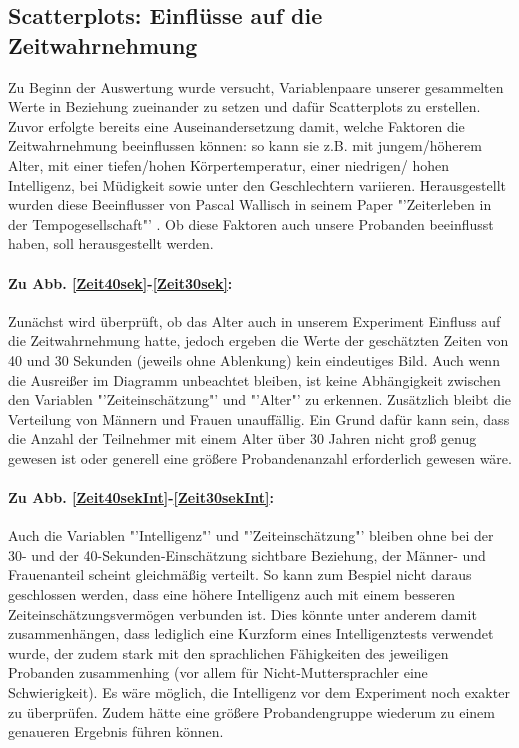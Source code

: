 \documentclass{Paper}
\begin{document}
\subsection{Scatterplots: Einflüsse auf die Zeitwahrnehmung}
Zu Beginn der Auswertung wurde versucht, Variablenpaare unserer gesammelten Werte in Beziehung zueinander zu setzen und dafür Scatterplots zu erstellen. Zuvor erfolgte bereits eine Auseinandersetzung damit, welche Faktoren die Zeitwahrnehmung beeinflussen können: so kann sie z.B. mit jungem/höherem Alter, mit einer tiefen/hohen Körpertemperatur, einer niedrigen/ hohen Intelligenz, bei Müdigkeit sowie unter den Geschlechtern variieren. Herausgestellt wurden diese Beeinflusser von Pascal Wallisch in seinem Paper "'Zeiterleben in der Tempogesellschaft"' \cite{Wallisch2003}. Ob diese Faktoren auch unsere Probanden beeinflusst haben, soll herausgestellt werden.

\paragraph{Zu Abb. \ref{Zeit40sek}-\ref{Zeit30sek}:}
Zunächst wird überprüft, ob das Alter auch in unserem Experiment Einfluss auf die Zeitwahrnehmung hatte, jedoch ergeben die Werte der geschätzten Zeiten von 40 und 30 Sekunden (jeweils ohne Ablenkung) kein eindeutiges Bild. Auch wenn die Ausreißer im Diagramm unbeachtet bleiben, ist keine Abhängigkeit zwischen den Variablen "'Zeiteinschätzung"' und "'Alter"' zu erkennen. Zusätzlich bleibt die Verteilung von Männern und Frauen unauffällig. Ein Grund dafür kann sein, dass die Anzahl der Teilnehmer mit einem Alter über 30 Jahren nicht groß genug gewesen ist oder generell eine größere Probandenanzahl erforderlich gewesen wäre.

\paragraph{Zu Abb. \ref{Zeit40sekInt}-\ref{Zeit30sekInt}:} Auch die Variablen "'Intelligenz"' und "'Zeiteinschätzung"' bleiben ohne bei der 30- und der 40-Sekunden-Einschätzung sichtbare Beziehung, der Männer- und Frauenanteil scheint gleichmäßig verteilt. So kann zum Bespiel nicht daraus geschlossen werden, dass eine höhere Intelligenz auch mit einem besseren Zeiteinschätzungsvermögen verbunden ist. Dies könnte unter anderem damit zusammenhängen, dass lediglich eine Kurzform eines Intelligenztests verwendet wurde, der zudem stark mit den sprachlichen Fähigkeiten des jeweiligen Probanden zusammenhing (vor allem für Nicht-Muttersprachler eine Schwierigkeit). Es wäre möglich, die Intelligenz vor dem Experiment noch exakter zu überprüfen. Zudem hätte eine größere Probandengruppe wiederum zu einem genaueren Ergebnis führen können.
\end{document}
